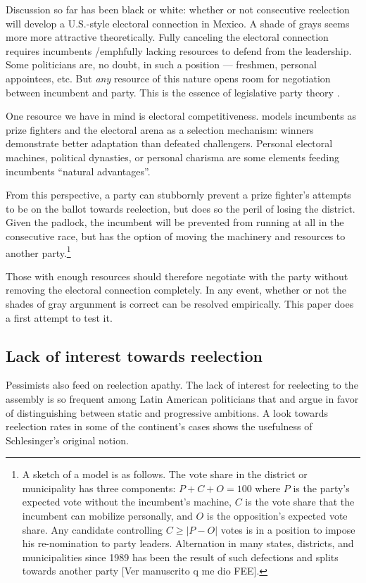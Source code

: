 \documentclass[letter,12pt]{article}
\begin{document}
Discussion so far has been black or white: whether or not consecutive reelection will develop a U.S.-style electoral connection in Mexico. A shade of grays seems more more attractive theoretically. Fully canceling the electoral connection requires incumbents /emph{fully} lacking resources to defend from the leadership. Some politicians are, no doubt, in such a position --- freshmen, personal appointees, etc. But \emph{any} resource of this nature opens room for negotiation between incumbent and party. This is the essence of legislative party theory \citep{cox.mccubbins.1993,aldrich.rohdeCPG2001}.

One resource we have in mind is electoral competitiveness. \citet{zallerprizeFighters} models incumbents as prize fighters and the electoral arena as a selection mechanism: winners demonstrate better adaptation than defeated challengers. Personal electoral machines, political dynasties, or personal charisma are some elements feeding incumbents ``natural advantages''. 

From this perspective, a party can stubbornly prevent a prize fighter's attempts to be on the ballot towards reelection, but does so the peril of losing the district. Given the padlock, the incumbent will be prevented from running at all in the consecutive race, but has the option of moving the machinery and resources to another party.\footnote{A sketch of a model is as follows. The vote share in the district or municipality has three components: $P + C + O = 100$ where $P$ is the party's expected vote without the incumbent's machine, $C$ is the vote share that the incumbent can mobilize personally, and $O$ is the opposition's expected vote share. Any candidate controlling $C \ge |P-O|$ votes is in a position to impose his re-nomination to party leaders. Alternation in many states, districts, and municipalities since 1989 has been the result of such defections and splits towards another party [Ver manuscrito q me dio FEE].}

Those with enough resources should therefore negotiate with the party without removing the electoral connection completely. In any event, whether or not the shades of gray argunment is correct can be resolved empirically. This paper does a first attempt to test it. 

\subsection{Lack of interest towards reelection}

\noindent Pessimists also feed on reelection apathy. The lack of interest for reelecting to the assembly is so frequent among Latin American politicians that \citet{morgenstern.2002b} and \citet{micozziPhD2009} argue in favor of distinguishing between static and progressive ambitions. A look towards reelection rates in some of the continent's cases shows the usefulness of Schlesinger's \citeyearpar{schlesinger.1966} original notion.
\end{document}
